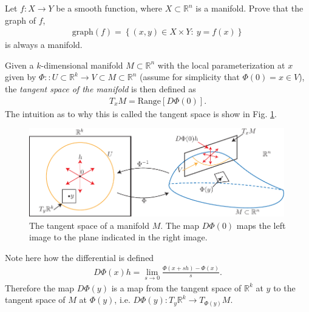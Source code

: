 \begin{exercise}
Let $f:X\rightarrow Y$ be a smooth function, where $X\subset\mathbb{R}^{n}$
is a manifold. Prove that the graph of $f$,
\begin{align}
\mathrm{graph}(f)=\left\{ (x,y)\in X\times Y:\ y=f(x)\right\} 
\end{align}
is always a manifold.
\end{exercise}

\begin{definition}
	Given a $k$-dimensional manifold $M\subset \mathbb{R}^{n}$ with the local parameterization at $x$ given by $\Phi:: U\subset \mathbb{R}^k \to V\subset M \subset \mathbb{R}^n$ (assume for simplicity that $\Phi(0)=x\in V$), the \emph{tangent space of the manifold} is then defined as
	\begin{align}
		\boxed{
			T_{x}M= \textrm{Range} [D\Phi(0)].
		}
	\end{align}
	The intuition as to why this is called the tangent space is show in Fig. \ref{fig:tangent_space_def}.
	\begin{figure}[h!]
		\centering
		\includegraphics[width=0.99\textwidth]{figures/ch9/6tangent_space_def.pdf}
		\caption{The tangent space of a manifold $M$. The map $D\Phi(0)$ maps the left image to the plane indicated in the right image.}
		\label{fig:tangent_space_def}
	\end{figure}
\end{definition}

Note here how the differential is defined
\begin{align}
	D \Phi(x)h = \lim_{s \to 0} \frac{\Phi(x + sh) - \Phi(x)}{s}.
\end{align}
Therefore the map $D\Phi(y)$ is a map from the tangent space of $\mathbb{R}^{k}$ at $y$ to the tangent space of $M$ at $\Phi(y)$, i.e. $D\Phi(y): T_{y}\mathbb{R}^{k}\to T_{\Phi(y)}M$. 

